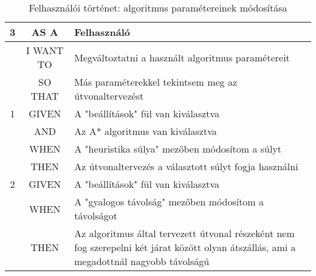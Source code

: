 \begin{table}[H]
    \centering
    \begin{tabular}{|c|c|p{10cm}|}
        \hline
        \textbf{3}
        & AS A          & Felhasználó \\ \hline
        & I WANT TO     & Megváltoztatni a használt algoritmus paramétereit \\ \hline
        & SO THAT       & Más paraméterekkel tekintsem meg az útvonaltervezést \\ \hline
        \hline
        1 & GIVEN & A "beállítások" fül van kiválasztva \\ \hline
        & AND     & Az A* algoritmus van kiválasztva \\ \hline
        & WHEN    & A "heuristika súlya" mezőben módosítom a súlyt \\ \hline
        & THEN    & Az útvonaltervezés a választott súlyt fogja használni \\ \hline
        \hline
        2 & GIVEN & A "beállítások" fül van kiválasztva \\ \hline
        & WHEN    & A "gyalogos távolság" mezőben módosítom a távolságot \\ \hline
        & THEN    & Az algoritmus által tervezett útvonal részeként nem fog szerepelni
                    két járat között olyan átszállás, ami a megadottnál nagyobb távolságú \\ \hline
    \end{tabular}
    \caption{Felhasználói történet: algoritmus paramétereinek módosítása}
    \label{tab:user-stories-parameters}
\end{table}


